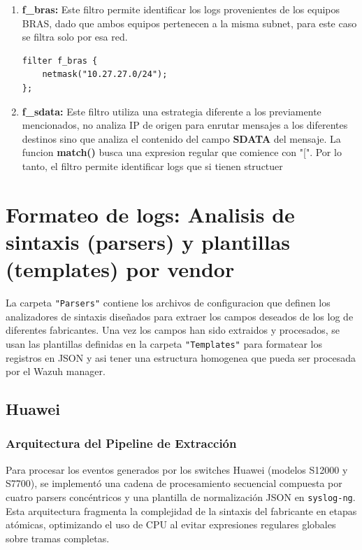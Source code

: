 \begin{enumerate}
    \item \textbf{f\_bras:} Este filtro permite identificar los logs provenientes de los equipos BRAS, dado que ambos equipos pertenecen a la misma subnet, para este caso se filtra solo por esa red.

\begin{lstlisting}[style=logstyle]
filter f_bras {
    netmask("10.27.27.0/24");
};
\end{lstlisting}

    \item \textbf{f\_sdata:} Este filtro utiliza una estrategia diferente a los previamente mencionados, no analiza IP de origen para enrutar mensajes a los diferentes destinos sino que analiza el contenido del campo \textbf{SDATA} del mensaje. La funcion \textbf{match()} busca una expresion regular que comience con "[". Por lo tanto, el filtro permite identificar logs que si tienen structuer 
\end{enumerate}

\section{Formateo de logs: Analisis de sintaxis (parsers) y plantillas (templates) por vendor}
La carpeta \texttt{"Parsers"} contiene los archivos de configuracion que definen los analizadores de sintaxis diseñados para extraer los campos deseados de los log de diferentes fabricantes. Una vez los campos han sido extraidos y procesados, se usan las plantillas definidas en la carpeta \texttt{"Templates"} para formatear los registros en JSON y asi tener una estructura homogenea que pueda ser procesada por el Wazuh manager.

\subsection{Huawei}

\subsubsection{Arquitectura del Pipeline de Extracción}
Para procesar los eventos generados por los switches Huawei (modelos S12000 y S7700), se implementó una cadena de procesamiento secuencial compuesta por cuatro parsers concéntricos y una plantilla de normalización JSON en \texttt{syslog-ng}. Esta arquitectura fragmenta la complejidad de la sintaxis del fabricante en etapas atómicas, optimizando el uso de CPU al evitar expresiones regulares globales sobre tramas completas.

